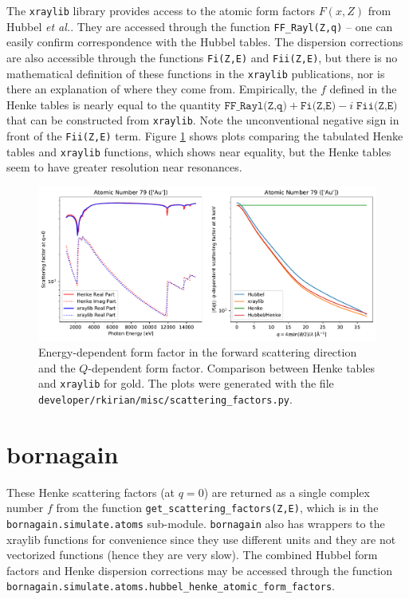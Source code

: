 \documentclass[11pt]{article}
\begin{document}
The \texttt{xraylib} library\cite{schoonjansXraylibLibraryXray2011,brunettiLibraryXrayMatter2004} provides access to the atomic form factors  $F(x,Z)$  from Hubbel {\itshape et al.}\cite{hubbellAtomicFormFactors1975}.  They are accessed through the function \texttt{FF\_Rayl(Z,q)} -- one can easily confirm correspondence with the Hubbel tables.  The dispersion corrections are also accessible through the functions \texttt{Fi(Z,E)} and \texttt{Fii(Z,E)}, but there is no mathematical definition of these functions in the \texttt{xraylib} publications, nor is there an explanation of where they come from.   Empirically, the $f$ defined in the Henke tables is nearly equal to the quantity $\texttt{FF\_Rayl(Z,q)} + \texttt{Fi(Z,E)} - i\; \texttt{Fii(Z,E)}$ that can be constructed from \texttt{xraylib}.  Note the unconventional negative sign in front of the \texttt{Fii(Z,E)} term.  Figure \ref{fig:forms} shows plots comparing the tabulated Henke tables and \texttt{xraylib} functions, which shows near equality, but the Henke tables seem to have greater resolution near resonances.
\begin{figure}[htbp]
   \centering
   \includegraphics[width=\textwidth]{figures/formfactor_79.pdf} 
   \caption{Energy-dependent form factor in the forward scattering direction and the $Q$-dependent form factor.  Comparison between Henke tables and \texttt{xraylib} for gold.  The plots were generated with the file \texttt{developer/rkirian/misc/scattering\_factors.py}.}
   \label{fig:forms}
\end{figure} 


\section{bornagain}

These Henke scattering factors (at $q=0$) are returned as a single complex number $f$ from the function \texttt{get\_scattering\_factors(Z,E)}, which is in the \texttt{bornagain.simulate.atoms} sub-module.  \texttt{bornagain} also has wrappers to the xraylib functions for convenience since they use different units and they are not vectorized functions (hence they are very slow).  The combined Hubbel form factors and Henke dispersion corrections may be accessed through the function \texttt{bornagain.simulate.atoms.hubbel\_henke\_atomic\_form\_factors}.
\end{document}
